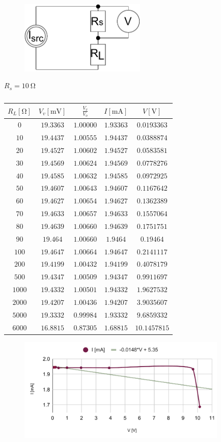 \begin{figure}[H]
	\centering
	\includegraphics[width=6cm]{schematics/3.pdf}
	\caption{}
\end{figure}

$R_s = \SI{10}{\ohm}$

\begin{table}[H]
	\centering
	\begin{tabular}{ c | c | c | c | c}
		$R_L [\unit{\ohm}]$ & $V_v[\unit{\milli\volt}]$ & $\frac{V_v}{V_o}$ & $I [\unit{\milli\ampere}]$ & $V [\unit{\volt}]$ \\
		\hline
		$0$ & $19.3363$ & $1.00000$ & $1.93363$ & $0.0193363$ \\
		$10$ & $19.4437$ & $1.00555$ & $1.94437$ & $0.0388874$ \\
		$20$ & $19.4527$ & $1.00602$ & $1.94527$ & $0.0583581$ \\
		$30$ & $19.4569$ & $1.00624$ & $1.94569$ & $0.0778276$ \\
		$40$ & $19.4585$ & $1.00632$ & $1.94585$ & $0.0972925$ \\
		$50$ & $19.4607$ & $1.00643$ & $1.94607$ & $0.1167642$ \\
		$60$ & $19.4627$ & $1.00654$ & $1.94627$ & $0.1362389$ \\
		$70$ & $19.4633$ & $1.00657$ & $1.94633$ & $0.1557064$ \\
		$80$ & $19.4639$ & $1.00660$ & $1.94639$ & $0.1751751$ \\
		$90$ & $19.464$ & $1.00660$ & $1.9464$ & $0.19464$ \\
		$100$ & $19.4647$ & $1.00664$ & $1.94647$ & $0.2141117$ \\
		$200$ & $19.4199$ & $1.00432$ & $1.94199$ & $0.4078179$ \\
		$500$ & $19.4347$ & $1.00509$ & $1.94347$ & $0.9911697$ \\
		$1000$ & $19.4332$ & $1.00501$ & $1.94332$ & $1.9627532$ \\
		$2000$ & $19.4207$ & $1.00436$ & $1.94207$ & $3.9035607$ \\
		$5000$ & $19.3332$ & $0.99984$ & $1.93332$ & $9.6859332$ \\
		$6000$ & $16.8815$ & $0.87305$ & $1.68815$ & $10.1457815$ \\
	\end{tabular}
	\caption {}
\end{table}

\begin{figure}[H]
	\centering
	\includegraphics[width=10cm]{schematics/chart5.pdf}
	\caption{}
\end{figure}